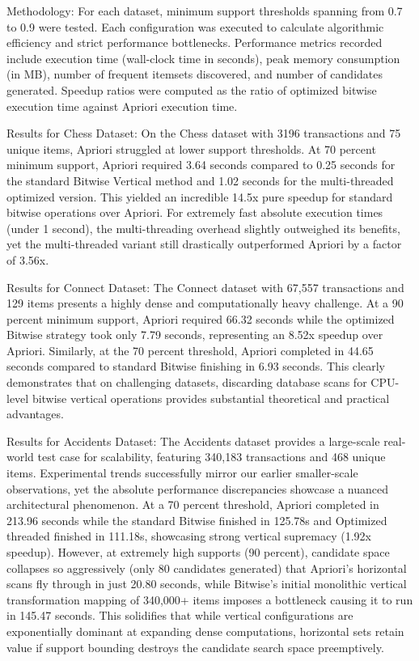\documentclass[conference]{IEEEtran}
\begin{document}
Methodology: For each dataset, minimum support thresholds spanning from 0.7 to 0.9 were tested. Each configuration was executed to calculate algorithmic efficiency and strict performance bottlenecks. Performance metrics recorded include execution time (wall-clock time in seconds), peak memory consumption (in MB), number of frequent itemsets discovered, and number of candidates generated. Speedup ratios were computed as the ratio of optimized bitwise execution time against Apriori execution time.

Results for Chess Dataset: On the Chess dataset with 3196 transactions and 75 unique items, Apriori struggled at lower support thresholds. At 70 percent minimum support, Apriori required 3.64 seconds compared to 0.25 seconds for the standard Bitwise Vertical method and 1.02 seconds for the multi-threaded optimized version. This yielded an incredible 14.5x pure speedup for standard bitwise operations over Apriori. For extremely fast absolute execution times (under 1 second), the multi-threading overhead slightly outweighed its benefits, yet the multi-threaded variant still drastically outperformed Apriori by a factor of 3.56x.

Results for Connect Dataset: The Connect dataset with 67,557 transactions and 129 items presents a highly dense and computationally heavy challenge. At a 90 percent minimum support, Apriori required 66.32 seconds while the optimized Bitwise strategy took only 7.79 seconds, representing an 8.52x speedup over Apriori. Similarly, at the 70 percent threshold, Apriori completed in 44.65 seconds compared to standard Bitwise finishing in 6.93 seconds. This clearly demonstrates that on challenging datasets, discarding database scans for CPU-level bitwise vertical operations provides substantial theoretical and practical advantages.

Results for Accidents Dataset: The Accidents dataset provides a large-scale real-world test case for scalability, featuring 340,183 transactions and 468 unique items. Experimental trends successfully mirror our earlier smaller-scale observations, yet the absolute performance discrepancies showcase a nuanced architectural phenomenon. At a 70 percent threshold, Apriori completed in 213.96 seconds while the standard Bitwise finished in 125.78s and Optimized threaded finished in 111.18s, showcasing strong vertical supremacy (1.92x speedup). However, at extremely high supports (90 percent), candidate space collapses so aggressively (only 80 candidates generated) that Apriori's horizontal scans fly through in just 20.80 seconds, while Bitwise's initial monolithic vertical transformation mapping of 340,000+ items imposes a bottleneck causing it to run in 145.47 seconds. This solidifies that while vertical configurations are exponentially dominant at expanding dense computations, horizontal sets retain value if support bounding destroys the candidate search space preemptively.
\end{document}
